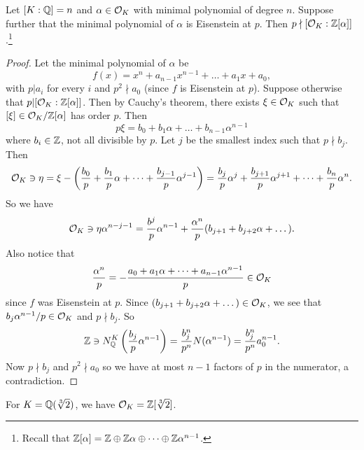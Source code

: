 \begin{prop}
  Let $[K : \mathbb{Q}] = n$ and $\alpha \in \mathcal{O}_K$
  with minimal polynomial of degree $n$. Suppose
  further that the minimal polynomial of $\alpha$ is
  Eisenstein at $p$. Then
  $p \nmid [\mathcal{O}_K : \mathbb{Z}[\alpha]]$.\footnote{Recall that $\mathbb{Z}[\alpha] = \mathbb{Z} \oplus \mathbb{Z} \alpha \oplus \dots \oplus \mathbb{Z} \alpha^{n - 1}$.}
\end{prop}

\begin{proof}
  Let the minimal polynomial of $\alpha$ be
  \[
    f(x) = x^n + a_{n - 1} x^{n - 1} + \dots + a_1 x + a_0,
  \]
  with $p | a_i$ for every $i$ and $p^2 \nmid a_0$
  (since $f$ is Eisenstein at $p$). Suppose
  otherwise that $p | [\mathcal{O}_K : \mathbb{Z}[\alpha]]$. Then
  by Cauchy's theorem, there exists  $\xi \in \mathcal{O}_K$
  such that $[\xi] \in \mathcal{O}_K / \mathbb{Z}[\alpha]$ has
  order $p$. Then
  \[
    p \xi = b_0 + b_1 \alpha + \dots + b_{n - 1} \alpha^{n - 1}
  \]
  where $b_i \in \mathbb{Z}$, not all divisible by $p$.
  Let $j$ be the smallest index such that $p \nmid b_j$.
  Then
  \[
    \mathcal{O}_K \ni \eta = \xi - \left(\frac{b_0}{p} + \frac{b_1}{p} \alpha + \dots + \frac{b_{j - 1}}{p} \alpha^{j - 1}\right)
    = \frac{b_j}{p} \alpha^j + \frac{b_{j + 1}}{p} \alpha^{j + 1} + \dots + \frac{b_n}{p} \alpha^n.
  \]
  So we have
  \[
    \mathcal{O}_K \ni \eta \alpha^{n - j - 1} = \frac{b^j}{p} \alpha^{n - 1} + \frac{\alpha^n}{p} (b_{j + 1} + b_{j + 2} \alpha + \dots).
  \]
  Also notice that
  \[
    \frac{\alpha^n}{p} = -\frac{a_0 + a_1 \alpha + \dots + a_{n - 1} \alpha^{n - 1}}{p} \in \mathcal{O}_K
  \]
  since $f$ was Eisenstein at $p$. Since
  $(b_{j + 1} + b_{j + 2} \alpha + \dots) \in \mathcal{O}_K$,
  we see that $b_j \alpha^{n - 1} / p \in \mathcal{O}_K$
  and $p \nmid b_j$. So
  \[
    \mathbb{Z} \ni N^K_{\mathbb{Q}}\left(\frac{b_j}{p} \alpha^{n - 1}\right)
    = \frac{b_j^n}{p^n} N(\alpha^{n - 1})
    = \frac{b_j^n}{p^n} a_0^{n - 1}.
  \]
  Now $p \nmid b_j$ and $p^2 \nmid a_0$ so we
  have at most $n - 1$ factors of $p$ in the numerator,
  a contradiction.
\end{proof}

\begin{prop}
  For $K = \mathbb{Q}(\sqrt[3]{2})$, we have
  $\mathcal{O}_K = \mathbb{Z}[\sqrt[3]{2}]$.
\end{prop}

